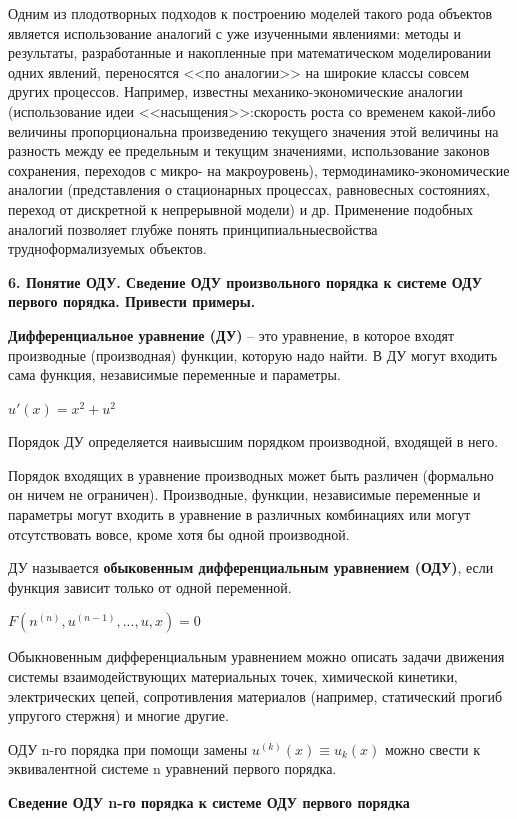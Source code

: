 \documentclass[a4paper,14pt]{article}
\begin{document}
Одним из плодотворных подходов к построению моделей такого рода объектов
является использование аналогий с уже изученными явлениями: методы
и результаты, разработанные и накопленные при математическом моделировании
одних явлений, переносятся <<по аналогии>> на широкие классы совсем других
процессов. Например, известны механико-экономические аналогии (использование
идеи <<насыщения>>:скорость роста со временем какой-либо величины пропорциональна
произведению текущего значения этой величины на разность между ее предельным
и текущим значениями, использование законов сохранения, переходов с микро-
на макроуровень), термодинамико-экономические аналогии (представления о 
стационарных процессах, равновесных состояниях, переход от дискретной
к непрерывной модели) и др. Применение подобных аналогий позволяет 
глубже понять принципиальныесвойства трудноформализуемых объектов.


\textbf{6. Понятие ОДУ. Сведение ОДУ произвольного порядка к системе ОДУ первого порядка. Привести примеры.}

\textbf{Дифференциальное уравнение (ДУ)} -- это уравнение, в которое входят производные (производная)
функции, которую надо найти. В ДУ могут входить сама функция, независимые переменные и параметры.

$u'(x) = x^2 + u^2$

Порядок ДУ определяется наивысшим порядком производной, входящей в него.

Порядок входящих в уравнение производных может быть различен (формально 
он ничем не ограничен). Производные, функции, независимые переменные и 
параметры могут входить в уравнение в различных комбинациях или могут 
отсутствовать вовсе, кроме хотя бы одной производной.

ДУ называется \textbf{обыковенным дифференциальным уравнением (ОДУ)}, если
функция зависит только от одной переменной.

$F(n^{(n)}, u^{(n-1)}, ..., u, x) = 0$

Обыкновенным дифференциальным уравнением можно описать задачи движения системы
взаимодействующих материальных точек, химической кинетики, электрических
цепей, сопротивления материалов (например, статический прогиб упругого стержня)
и многие другие.

ОДУ n-го порядка при помощи замены $u^{(k)}(x) \equiv u_k(x)$ можно
свести к эквивалентной системе n уравнений первого порядка.

\textbf{Сведение ОДУ n-го порядка к системе ОДУ первого порядка}
\end{document}
